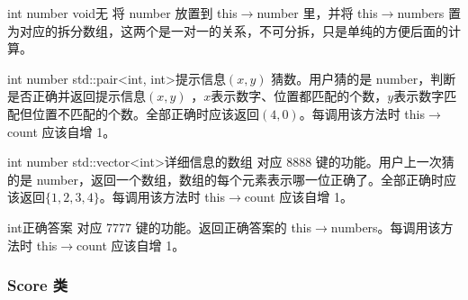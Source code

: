 

{int number}
{void}{无}
{将 number 放置到 this$\to$number 里，并将 this$\to$numbers 置为对应的拆分数组，这两个是一对一的关系，不可分拆，只是单纯的方便后面的计算。}

{int number}
{std::pair<int, int>}{提示信息$(x,y)$}
{猜数。用户猜的是 number，判断是否正确并返回提示信息$(x,y)$ ，$x$表示数字、位置都匹配的个数，$y$表示数字匹配但位置不匹配的个数。全部正确时应该返回$(4,0)$。每调用该方法时 this$\to$count 应该自增 1。}

{int number}
{std::vector<int>}{详细信息的数组}
{对应 8888 键的功能。用户上一次猜的是 number，返回一个数组，数组的每个元素表示哪一位正确了。全部正确时应该返回$\{1,2,3,4\}$。每调用该方法时 this$\to$count 应该自增 1。}

{}
{int}{正确答案}
{对应 7777 键的功能。返回正确答案的 this$\to$numbers。每调用该方法时 this$\to$count 应该自增 1。}

\subsubsection{Score 类}

